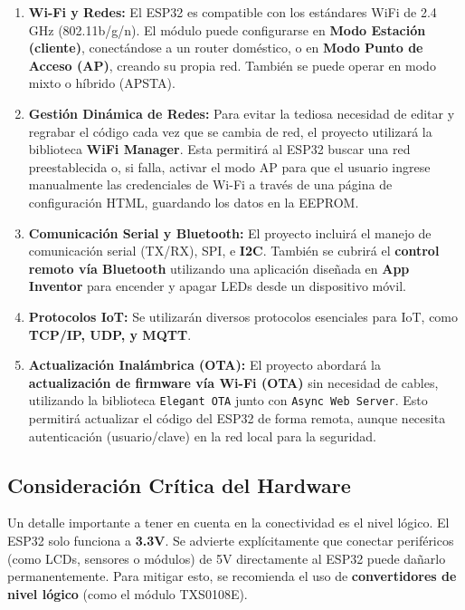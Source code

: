 \documentclass{article}
\begin{document}
\begin{enumerate}
    \item \textbf{Wi-Fi y Redes:} El ESP32 es compatible con los 
    estándares WiFi de 2.4 GHz (802.11b/g/n). El módulo puede 
    configurarse en \textbf{Modo Estación (cliente)}, conectándose a un 
    router doméstico, o en \textbf{Modo Punto de Acceso (AP)}, creando 
    su propia red. También se puede operar en modo mixto o híbrido 
    (APSTA).

    \item \textbf{Gestión Dinámica de Redes:} Para evitar la tediosa 
    necesidad de editar y regrabar el código cada vez que se cambia 
    de red, el proyecto utilizará la biblioteca \textbf{WiFi Manager}. 
    Esta permitirá al ESP32 buscar una red preestablecida o, si falla, 
    activar el modo AP para que el usuario ingrese manualmente las 
    credenciales de Wi-Fi a través de una página de configuración HTML, 
    guardando los datos en la EEPROM.

    \item \textbf{Comunicación Serial y Bluetooth:} El proyecto incluirá 
    el manejo de comunicación serial (TX/RX), SPI, e \textbf{I2C}. 
    También se cubrirá el \textbf{control remoto vía Bluetooth} 
    utilizando una aplicación diseñada en \textbf{App Inventor} para 
    encender y apagar LEDs desde un dispositivo móvil.

    \item \textbf{Protocolos IoT:} Se utilizarán diversos protocolos 
    esenciales para IoT, como \textbf{TCP/IP, UDP, y MQTT}.

    \item \textbf{Actualización Inalámbrica (OTA):} El proyecto abordará 
    la \textbf{actualización de firmware vía Wi-Fi (OTA)} sin necesidad 
    de cables, utilizando la biblioteca \texttt{Elegant OTA} junto con 
    \texttt{Async Web Server}. Esto permitirá actualizar el código del 
    ESP32 de forma remota, aunque necesita autenticación (usuario/clave) 
    en la red local para la seguridad.
\end{enumerate}

\subsection{Consideración Crítica del Hardware}

Un detalle importante a tener en cuenta en la conectividad es el nivel 
lógico. El ESP32 solo funciona a \textbf{3.3V}. Se advierte 
explícitamente que conectar periféricos (como LCDs, sensores o módulos) 
de 5V directamente al ESP32 puede dañarlo permanentemente. Para mitigar 
esto, se recomienda el uso de \textbf{convertidores de nivel lógico} 
(como el módulo TXS0108E).
\end{document}
